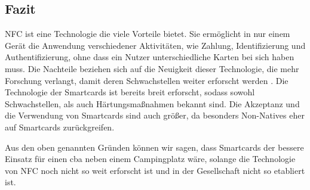 \subsection{Fazit}

NFC ist eine Technologie die viele Vorteile bietet. Sie ermöglicht in nur einem Gerät die Anwendung
verschiedener Aktivitäten, wie Zahlung, Identifizierung und Authentifizierung, ohne dass ein Nutzer 
unterschiedliche Karten bei sich haben muss. Die Nachteile beziehen sich auf die Neuigkeit dieser Technologie,
die mehr Forschung verlangt, damit deren Schwachstellen weiter erforscht werden \cite{refart:ALSI}. Die
Technologie der Smartcards ist bereits breit erforscht, sodass sowohl Schwachstellen, als auch Härtungsmaßnahmen
bekannt sind. Die Akzeptanz und die Verwendung von Smartcards sind auch größer, da besonders Non-Natives eher auf
Smartcards zurückgreifen.

Aus den oben genannten Gründen können wir sagen, dass Smartcards der bessere Einsatz für einen \acrshort{cba}
neben einem Campingplatz wäre, solange die Technologie von NFC noch nicht so weit erforscht ist und in der 
Gesellschaft nicht so etabliert ist.
